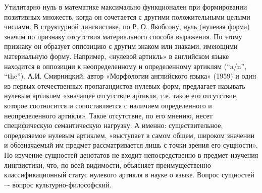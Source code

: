 Утилитарно нуль в математике максимально функционален при формировании позитивных множеств, когда он сочетается с другими положительными целыми числами. В структурной лингвистике, по Р. О. Якобсону, нуль (нулевая форма) значим по признаку отсутствия материального способа выражения.  По этому признаку он образует оппозицию с другим знаком или знаками, имеющими материальную форму. Например, «нулевой артикль» в английском языке находится в оппозиции к неопределенному и определенному артиклям (“a/n”, “the”).  А.И. Смирницкий,  автор «Морфологии английского языка» (1959) и один из первых отечественных пропагандистов нулевых форм, предлагает называть нулевым артиклем «значащее отсутствие артикля, т.е. такое его отсутствие, которое соотносится и сопоставляется с наличием определенного и неопределенного артикля».\autocite[][382]{smirnizki1959} Такое отсутствие, по его мнению, несет специфическую семантическую нагрузку. А именно: существительное, определяемое нулевым артиклем, «выступает в самом общем, широком значении и обозначаемый им предмет рассматривается лишь с точки зрения его сущности».\autocite[][383]{smirnizki1959} Но изучение сущностей денотатов не входит непосредственно в предмет изучения лингвистики, что, по всей видимости, объясняет преимущественно классификационный статус нулевого артикля в науке о языке. \autocite{berezowski2009}Вопрос сущностей –- вопрос культурно-философский. 

